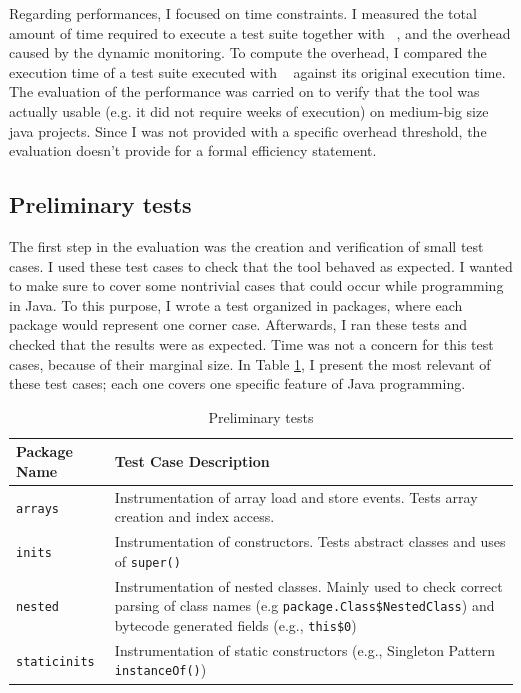 Regarding performances, I focused on time constraints. I measured the total amount of time required to execute a test suite together with \datec~, and the overhead caused by the dynamic monitoring. To compute the overhead, I compared the execution time of a test suite executed with \datec~ against its original execution time. The evaluation of the performance was carried on to verify that the tool was actually usable (e.g. it did not require weeks of execution) on medium-big size java projects.%
Since I was not provided with a specific overhead threshold, the evaluation doesn't provide for a formal efficiency statement. 
 
\subsection{Preliminary tests}
The first step in the evaluation was the creation and verification of small test cases. I used these test cases to check that the tool behaved as expected. I wanted to make sure to cover some nontrivial cases that could occur while programming in Java. To this purpose, I wrote a test organized in packages, where each package would represent one corner case. Afterwards, I ran these tests and checked that the results were as expected. Time was not a concern for this test cases, because of their marginal size. In Table \ref{table:minitest}, I present the most relevant of these test cases; each one covers one specific feature of Java programming.

\begin{table}[H] 
  \centering
    \begin{tabular}{|l|p{}|}
    \hline
   \textbf{Package Name} & \textbf{Test Case Description}\\ \hline
      \texttt{arrays}  &  Instrumentation of array load and store events. Tests array creation and index access.\\ \hline
      \texttt{inits}  &  Instrumentation of constructors. Tests abstract classes and uses of \texttt{super()}\\ \hline
      \texttt{nested}  &  Instrumentation of nested classes. Mainly used to check correct parsing of class names (e.g \texttt{package.Class\$NestedClass}) and bytecode generated fields (e.g., \texttt{this\$0})\\ \hline
      \texttt{staticinits}  &  Instrumentation of static constructors (e.g., Singleton Pattern \texttt{instanceOf()}) \\ \hline
    \end{tabular}
    \caption{Preliminary tests}
    \label{table:minitest}
\end{table}

